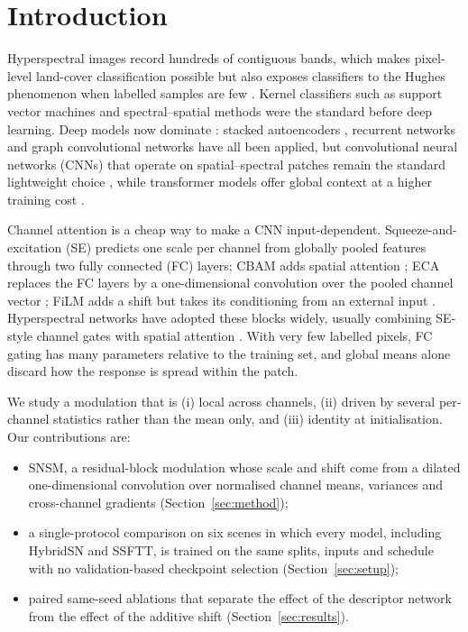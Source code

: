 \documentclass[]{interact}
\begin{document}
\section{Introduction}
Hyperspectral images record hundreds of contiguous bands, which makes pixel-level land-cover classification possible but also exposes classifiers to the Hughes phenomenon when labelled samples are few \citep{hughes1968mean,bioucas2013analysis}. Kernel classifiers such as support vector machines \citep{camps2005kernel,melgani2004classification} and spectral--spatial methods \citep{fauvel2013advances,ghamisi2017advanced} were the standard before deep learning. Deep models now dominate \citep{li2019overview,audebert2019review}: stacked autoencoders \citep{chen2014deep}, recurrent networks \citep{mou2017rnn} and graph convolutional networks \citep{hong2021gcn} have all been applied, but convolutional neural networks (CNNs) that operate on spatial--spectral patches remain the standard lightweight choice \citep{hu2015deep,makantasis2015deep,chen2016deep,li2017spectral,zhong2018ssrn,roy2020hybridsn}, while transformer models offer global context at a higher training cost \citep{hong2022spectralformer,sun2022ssftt}.

Channel attention is a cheap way to make a CNN input-dependent. Squeeze-and-excitation (SE) \citep{hu2018squeeze} predicts one scale per channel from globally pooled features through two fully connected (FC) layers; CBAM adds spatial attention \citep{woo2018cbam}; ECA replaces the FC layers by a one-dimensional convolution over the pooled channel vector \citep{wang2020eca}; FiLM adds a shift but takes its conditioning from an external input \citep{perez2018film}. Hyperspectral networks have adopted these blocks widely, usually combining SE-style channel gates with spatial attention \citep{mei2019attention,haut2019attention,li2020dbda,zhu2021rssan,roy2021a2s2k}. With very few labelled pixels, FC gating has many parameters relative to the training set, and global means alone discard how the response is spread within the patch.

We study a modulation that is (i) local across channels, (ii) driven by several per-channel statistics rather than the mean only, and (iii) identity at initialisation. Our contributions are:
\begin{itemize}
\item SNSM, a residual-block modulation whose scale and shift come from a dilated one-dimensional convolution over normalised channel means, variances and cross-channel gradients (Section~\ref{sec:method});
\item a single-protocol comparison on six scenes in which every model, including HybridSN and SSFTT, is trained on the same splits, inputs and schedule with no validation-based checkpoint selection (Section~\ref{sec:setup});
\item paired same-seed ablations that separate the effect of the descriptor network from the effect of the additive shift (Section~\ref{sec:results}).
\end{itemize}
\end{document}
